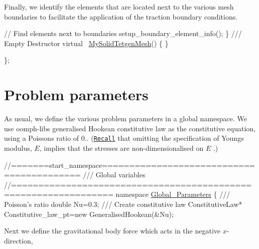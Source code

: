 Finally, we identify the elements that are located next to the various mesh boundaries to facilitate the application of the traction boundary conditions.


\begin{DoxyCodeInclude}
   
   \textcolor{comment}{// Find elements next to boundaries}
   setup\_boundary\_element\_info();
  \}
\textcolor{comment}{}
\textcolor{comment}{ /// Empty Destructor}
\textcolor{comment}{} \textcolor{keyword}{virtual} ~\hyperlink{classMySolidTetgenMesh}{MySolidTetgenMesh}() \{ \}


\};

\end{DoxyCodeInclude}




 

\hypertarget{index_namespace}{}\section{Problem parameters}\label{index_namespace}
As usual, we define the various problem parameters in a global namespace. We use {\ttfamily oomph-\/lib\textquotesingle{}s} generalised Hookean constitutive law as the constitutive equation, using a Poisson\textquotesingle{}s ratio of 0.. (\href{../../solid_theory/html/index.html#non-dim_solid}{\tt Recall} that omitting the specification of Young\textquotesingle{}s modulus, $ E $, implies that the stresses are non-\/dimensionalised on $ E $ .)


\begin{DoxyCodeInclude}
\textcolor{comment}{//=======start\_namespace==========================================}
\textcolor{comment}{/// Global variables}
\textcolor{comment}{}\textcolor{comment}{//================================================================}
\textcolor{keyword}{namespace }\hyperlink{namespaceGlobal__Parameters}{Global\_Parameters}
\{
\textcolor{comment}{}
\textcolor{comment}{ /// Poisson's ratio}
\textcolor{comment}{} \textcolor{keywordtype}{double} Nu=0.3;
 \textcolor{comment}{}
\textcolor{comment}{ /// Create constitutive law}
\textcolor{comment}{} ConstitutiveLaw* Constitutive\_law\_pt=\textcolor{keyword}{new} GeneralisedHookean(&Nu);

\end{DoxyCodeInclude}


Next we define the gravitational body force which acts in the negative $x$-\/direction,


